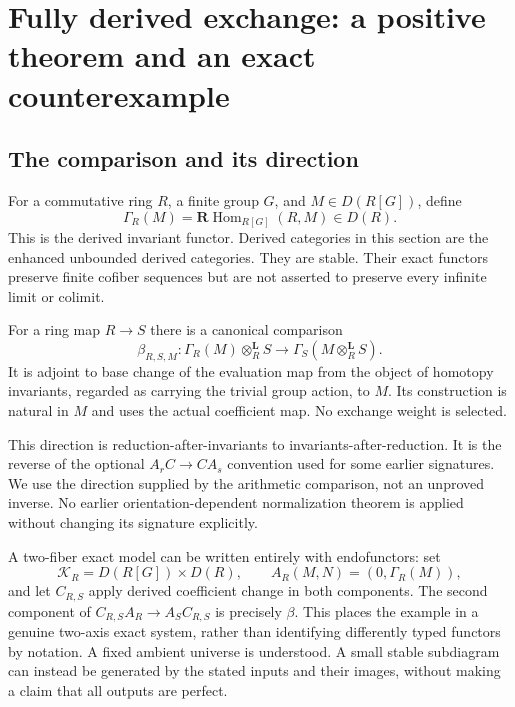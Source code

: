 \documentclass[11pt]{article}
\theoremstyle{definition}
\theoremstyle{remark}
\begin{document}
\section{Fully derived exchange: a positive theorem and an exact counterexample}\label{sec:derived-invariant-exchange}

\subsection{The comparison and its direction}

For a commutative ring $R$, a finite group $G$, and $M\in D(R[G])$, define
\[
 \Gamma_R(M)=\mathbf R\operatorname{Hom}_{R[G]}(R,M)\in D(R).
\]
This is the derived invariant functor. Derived categories in this section are the enhanced unbounded derived categories. They are stable. Their exact functors preserve finite cofiber sequences but are not asserted to preserve every infinite limit or colimit.

For a ring map $R\to S$ there is a canonical comparison
\[
 \boxed{\beta_{R,S,M}:\Gamma_R(M)\otimes_R^{\mathbf L}S
 \longrightarrow\Gamma_S(M\otimes_R^{\mathbf L}S).}
\]
It is adjoint to base change of the evaluation map from the object of homotopy invariants, regarded as carrying the trivial group action, to $M$. Its construction is natural in $M$ and uses the actual coefficient map. No exchange weight is selected.

This direction is reduction-after-invariants to invariants-after-reduction. It is the reverse of the optional $A_rC\to CA_s$ convention used for some earlier signatures. We use the direction supplied by the arithmetic comparison, not an unproved inverse. No earlier orientation-dependent normalization theorem is applied without changing its signature explicitly.

A two-fiber exact model can be written entirely with endofunctors: set
\[
 \mathcal K_R=D(R[G])\times D(R),\qquad
 A_R(M,N)=(0,\Gamma_R(M)),
\]
and let $C_{R,S}$ apply derived coefficient change in both components. The second component of $C_{R,S}A_R\to A_SC_{R,S}$ is precisely $\beta$. This places the example in a genuine two-axis exact system, rather than identifying differently typed functors by notation. A fixed ambient universe is understood. A small stable subdiagram can instead be generated by the stated inputs and their images, without making a claim that all outputs are perfect.
\end{document}
